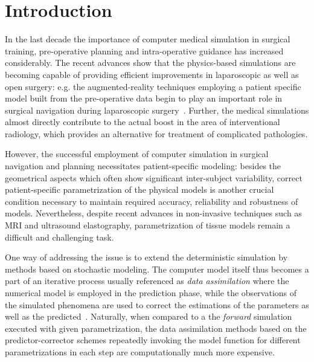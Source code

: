 \section{Introduction}
\label{s:intro}
In the last decade the importance of computer medical simulation in surgical training, pre-operative planning and intra-operative guidance has increased considerably. The recent advances show that the physics-based simulations are becoming capable of providing efficient improvements in laparoscopic as well as open surgery: e.g. the augmented-reality techniques employing a patient specific model built from the pre-operative data begin to play an important role in surgical navigation during laparoscopic surgery~\cite{haouchine2015impact}. Further, the medical simulations almost directly contribute to the actual boost in the area of interventional radiology, which provides an alternative for treatment of complicated pathologies. 

However, the successful employment of computer simulation in surgical navigation and planning necessitates patient-specific modeling: 
besides the geometrical aspects which often show significant inter-subject variability, correct patient-specific parametrization of the physical models is another crucial condition necessary to maintain required accuracy, reliability and robustness of models. Nevertheless, despite recent advances in non-invasive techniques such as MRI and ultrasound elastography, parametrization of tissue models remain a difficult and challenging task. 

One way of addressing the issue is to extend the deterministic simulation by methods based on stochastic modeling. The computer model itself thus becomes a part of an iterative process usually referenced as \emph{data assimilation} where the numerical model is employed in the prediction phase, while the observations of the simulated phenomena are used to correct the estimations of the parameters as well as the predicted~\cite{grewal2014kalman}. Naturally, when compared to a  the \emph{forward} simulation executed with given parametrization, the data assimilation methods based on the predictor-corrector schemes repeatedly invoking 
the model function for different parametrizations in each step are computationally much more expensive.

